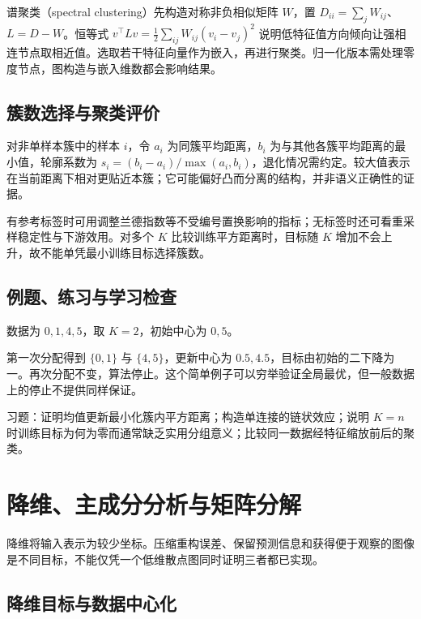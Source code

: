\documentclass[UTF8,12pt,a4paper,fontset=fandol]{ctexbook}
\begin{document}
谱聚类（spectral clustering）先构造对称非负相似矩阵 $W$，置 $D_{ii}=\sum_jW_{ij}$、$L=D-W$。恒等式
$v^\top Lv=\tfrac12\sum_{ij}W_{ij}(v_i-v_j)^2$
说明低特征值方向倾向让强相连节点取相近值。选取若干特征向量作为嵌入，再进行聚类。归一化版本需处理零度节点，图构造与嵌入维数都会影响结果。

\section{簇数选择与聚类评价}

对非单样本簇中的样本 $i$，令 $a_i$ 为同簇平均距离，$b_i$ 为与其他各簇平均距离的最小值，轮廓系数为 $s_i=(b_i-a_i)/\max(a_i,b_i)$，退化情况需约定。较大值表示在当前距离下相对更贴近本簇；它可能偏好凸而分离的结构，并非语义正确性的证据。

有参考标签时可用调整兰德指数等不受编号置换影响的指标；无标签时还可看重采样稳定性与下游效用。对多个 $K$ 比较训练平方距离时，目标随 $K$ 增加不会上升，故不能单凭最小训练目标选择簇数。

\section{例题、练习与学习检查}

\begin{example}[一维均值聚类]
数据为 $0,1,4,5$，取 $K=2$，初始中心为 $0,5$。
\end{example}
\begin{solve}
第一次分配得到 $\{0,1\}$ 与 $\{4,5\}$，更新中心为 $0.5,4.5$，目标由初始的二下降为一。再次分配不变，算法停止。这个简单例子可以穷举验证全局最优，但一般数据上的停止不提供同样保证。
\end{solve}

习题：证明均值更新最小化簇内平方距离；构造单连接的链状效应；说明 $K=n$ 时训练目标为何为零而通常缺乏实用分组意义；比较同一数据经特征缩放前后的聚类。

\chapter{降维、主成分分析与矩阵分解}
\label{chap:ml-dimension}

降维将输入表示为较少坐标。压缩重构误差、保留预测信息和获得便于观察的图像是不同目标，不能仅凭一个低维散点图同时证明三者都已实现。

\section{降维目标与数据中心化}
\end{document}

